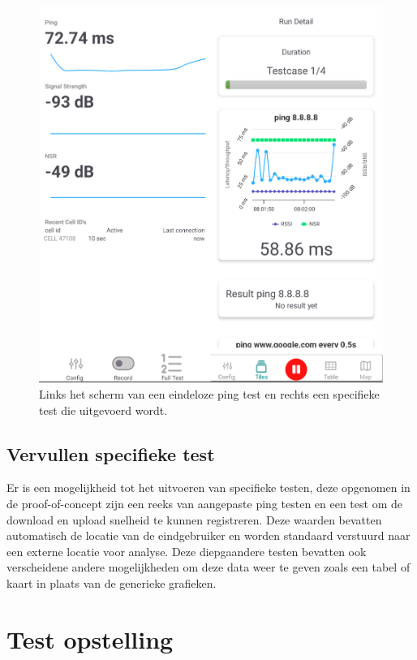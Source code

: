 \begin{figure}[!htb]
    \includegraphics[width=1\linewidth]{graphics/continuousspecificmerge}
    \caption[Links het scherm van een eindeloze ping test en rechts een specifieke test die uitgevoerd wordt.]{Links het scherm van een eindeloze ping test en rechts een specifieke test die uitgevoerd wordt.}
    \label{fig:continuousandspecific}
\end{figure}

\subsection{Vervullen specifieke test}

Er is een mogelijkheid tot het uitvoeren van specifieke testen, deze opgenomen in de proof-of-concept zijn een reeks van aangepaste ping testen en een test om de download en upload snelheid te kunnen registreren. Deze waarden bevatten automatisch de locatie van de eindgebruiker en worden standaard verstuurd naar een externe locatie voor analyse. Deze diepgaandere testen bevatten ook verscheidene andere mogelijkheden om deze data weer te geven zoals een tabel of kaart in plaats van de generieke grafieken.

\section{Test opstelling}

